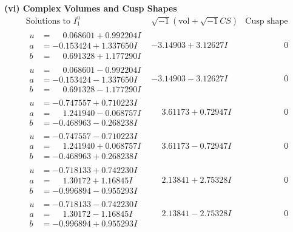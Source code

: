 \documentclass[1p]{elsarticle_modified}
\theoremstyle{definition}
\newcommand{\I}{\sqrt{-1}}
\begin{document}
\newpage\flushleft \textbf{(vi) Complex Volumes and Cusp Shapes}
$$\begin{array}{c|c|c}  
\text{Solutions to }I^u_{1}& \I (\text{vol} + \sqrt{-1}CS) & \text{Cusp shape}\\
 \hline 
\begin{aligned}
u &= \phantom{-}0.068601 + 0.992204 I \\
a &= -0.153424 + 1.337650 I \\
b &= \phantom{-}0.691328 + 1.177290 I\end{aligned}
 & -3.14903 + 3.12627 I & \phantom{-0.000000 } 0 \\ \hline\begin{aligned}
u &= \phantom{-}0.068601 - 0.992204 I \\
a &= -0.153424 - 1.337650 I \\
b &= \phantom{-}0.691328 - 1.177290 I\end{aligned}
 & -3.14903 - 3.12627 I & \phantom{-0.000000 } 0 \\ \hline\begin{aligned}
u &= -0.747557 + 0.710223 I \\
a &= \phantom{-}1.241940 - 0.068757 I \\
b &= -0.468963 - 0.268238 I\end{aligned}
 & \phantom{-}3.61173 + 0.72947 I & \phantom{-0.000000 } 0 \\ \hline\begin{aligned}
u &= -0.747557 - 0.710223 I \\
a &= \phantom{-}1.241940 + 0.068757 I \\
b &= -0.468963 + 0.268238 I\end{aligned}
 & \phantom{-}3.61173 - 0.72947 I & \phantom{-0.000000 } 0 \\ \hline\begin{aligned}
u &= -0.718133 + 0.742230 I \\
a &= \phantom{-}1.30172 + 1.16845 I \\
b &= -0.996894 - 0.955293 I\end{aligned}
 & \phantom{-}2.13841 + 2.75328 I & \phantom{-0.000000 } 0 \\ \hline\begin{aligned}
u &= -0.718133 - 0.742230 I \\
a &= \phantom{-}1.30172 - 1.16845 I \\
b &= -0.996894 + 0.955293 I\end{aligned}
 & \phantom{-}2.13841 - 2.75328 I & \phantom{-0.000000 } 0 \\ \hline\begin{aligned}

\end{aligned}
\end{array}$$
\end{document}
